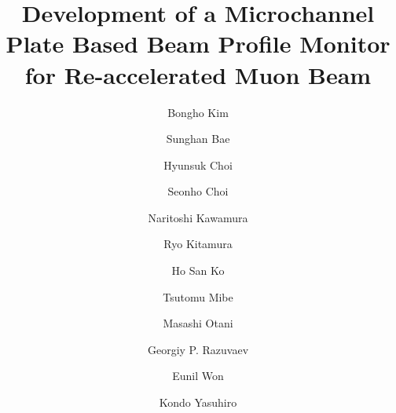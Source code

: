 \documentclass[preprint,3p,twocolumn]{elsarticle}
\begin{document}
\begin{frontmatter}

\title{ Development of a Microchannel Plate Based Beam Profile Monitor for Re-accelerated Muon Beam}


\author[mymainaddress,mymainaddress1]{Bongho Kim}
\author[mymainaddress,mymainaddress1]{Sunghan Bae}
\author[mymainaddress,mymainaddress1]{Hyunsuk Choi}
\author[mymainaddress,mymainaddress1]{Seonho Choi}
\author[fifthaddress,fifthaddress1]{Naritoshi Kawamura}
\author[secondaddress]{Ryo Kitamura}
\author[mymainaddress,mymainaddress1]{Ho San Ko}
\author[thirdaddress]{Tsutomu Mibe}
\author[thirdaddress]{Masashi Otani}
\author[fourthaddress,fourthaddress1]{Georgiy P. Razuvaev}
\author[sixthaddress]{Eunil Won}
\author[seventhaddress]{Kondo Yasuhiro}
\address[mymainaddress]{Department of Physics and Astronomy, Seoul National University, Seoul, 08826, Korea}
\address[mymainaddress1]{Institute for Nuclear and Particle Astrophysics, Seoul National University, Seoul, 08826, Korea}
\address[secondaddress]{Department of Physics, University of Tokyo, Tokyo 113-0033, Japan}
\address[thirdaddress]{High Energy Accelerator Research Organization (KEK), Tsukuba 305-0801, Japan}
\address[fourthaddress]{Budker Institute of Nuclear Physics SB RAS, Novosibirsk 630090, Russia}
\address[fourthaddress1]{Novosibirsk State University, Novosibirsk 630090, Russia}
\address[fifthaddress]{Muon Sci. Lab., Institute of Materials Structure Science, High Accelerator Research Organization, Tsukuba, 305-0801, Japan}
\address[fifthaddress1]{Muon Sci. Sec., Materials and Life Science Facility, J-PARC, Tokai, 319-1195, Japan}
\address[sixthaddress]{Department of Physics, Korea University, Seoul, 02841, Korea}
\address[seventhaddress]{Japan Atomic Energy Agency (JAEA), Tokai, 319-1195, Japan}

\begin{abstract}


\end{abstract}
\end{frontmatter}
\end{document}
